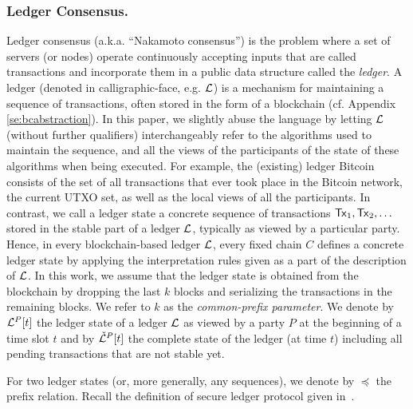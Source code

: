 \subsubsection{Ledger Consensus.}
Ledger consensus (a.k.a. ``Nakamoto consensus'') is the problem where a set of servers
(or nodes) operate continuously accepting inputs
that are called transactions and incorporate them in a public data 
structure called the {\em ledger}. 
A ledger (denoted in calligraphic-face, e.g. $\mathcal{L}$) is a mechanism for maintaining a sequence of transactions, often
stored in the form of a blockchain (cf. Appendix \ref{se:bcabstraction}). In this paper, we slightly abuse the language by letting $\mathcal{L}$ (without further
qualifiers) interchangeably refer to the algorithms used to maintain the sequence, and all the views of the
participants of the state of these algorithms when being executed. For example, the (existing) ledger Bitcoin
consists of the set of all transactions that ever took place in the Bitcoin network, the current UTXO set, as
well as the local views of all the participants.
In contrast, we call a ledger state a concrete sequence of transactions $\mathsf{Tx}_1,\mathsf{Tx}_2,\dots$ stored in the stable
part of a ledger $\mathcal{L}$, typically as viewed by a particular party. Hence, in every blockchain-based ledger $\mathcal{L}$,
every fixed chain $C$ defines a concrete ledger state by applying the interpretation rules given as a part of the
description of $\mathcal{L}$. In this work, we assume that the ledger state is obtained from the blockchain by dropping the last $k$ blocks
and serializing the transactions in the remaining blocks. We refer to $k$ as the \emph{common-prefix parameter}.
We denote by $\mathcal{L}^P[t]$ the ledger state of a ledger $\mathcal{L}$ as viewed by a party $P$ at the beginning of a time slot $t$
and by ${\check {\mathcal{L}}}^{P}[t]$ the complete state of the ledger (at time $t$) including all pending transactions that are not stable yet. 


For two ledger states (or, more generally, any sequences), we denote by $\preceq$ the prefix relation.
Recall the definition of secure ledger protocol given in~\cite{sok}.


